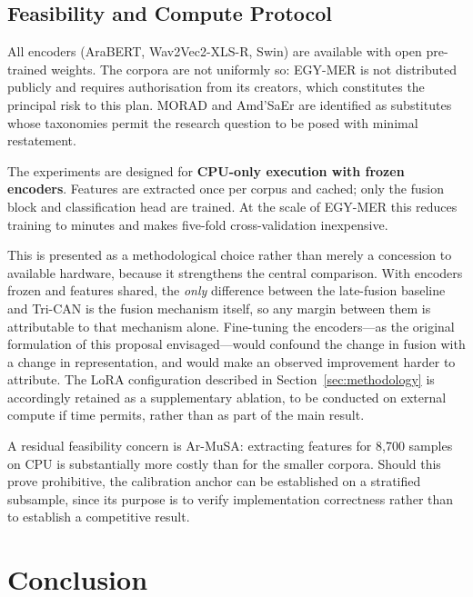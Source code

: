 \documentclass[12pt, a4paper]{article}
\begin{document}
\subsection{Feasibility and Compute Protocol}\label{sec:feasibility}
All encoders (AraBERT, Wav2Vec2-XLS-R, Swin) are available with open pre-trained weights. The corpora are not uniformly so: EGY-MER is not distributed publicly and requires authorisation from its creators, which constitutes the principal risk to this plan. MORAD and Amd'SaEr \citep{Atou2026, Haouhat2025a} are identified as substitutes whose taxonomies permit the research question to be posed with minimal restatement.

The experiments are designed for \textbf{CPU-only execution with frozen encoders}. Features are extracted once per corpus and cached; only the fusion block and classification head are trained. At the scale of EGY-MER this reduces training to minutes and makes five-fold cross-validation inexpensive.

This is presented as a methodological choice rather than merely a concession to available hardware, because it strengthens the central comparison. With encoders frozen and features shared, the \emph{only} difference between the late-fusion baseline and Tri-CAN is the fusion mechanism itself, so any margin between them is attributable to that mechanism alone. Fine-tuning the encoders---as the original formulation of this proposal envisaged---would confound the change in fusion with a change in representation, and would make an observed improvement harder to attribute. The LoRA configuration described in Section~\ref{sec:methodology} is accordingly retained as a supplementary ablation, to be conducted on external compute if time permits, rather than as part of the main result.

A residual feasibility concern is Ar-MuSA: extracting features for 8{,}700 samples on CPU is substantially more costly than for the smaller corpora. Should this prove prohibitive, the calibration anchor can be established on a stratified subsample, since its purpose is to verify implementation correctness rather than to establish a competitive result.


\section{Conclusion}\label{sec:conclusion}
\end{document}

